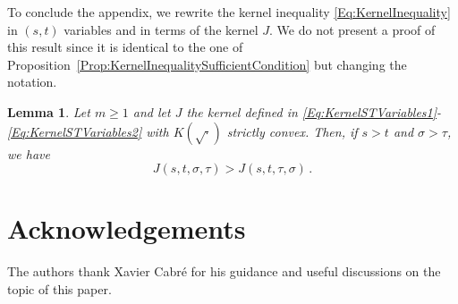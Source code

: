 \documentclass[12pt,reqno]{amsart}
\newtheorem{lemma}[theorem]{Lemma}
\theoremstyle{definition}
\theoremstyle{remark}
\numberwithin{equation}{section}
\begin{document}
To conclude the appendix, we rewrite the kernel inequality \eqref{Eq:KernelInequality} in $(s,t)$ variables and in terms of the kernel $J$. We do not present a proof of this result since it is identical to the one of Proposition~\ref{Prop:KernelInequalitySufficientCondition} but changing the notation.

\begin{lemma}
	\label{Lemma:KernelInequalityCone} Let $m\geq 1$ and let $J$ the kernel defined in
	\eqref{Eq:KernelSTVariables1}-\eqref{Eq:KernelSTVariables2} with $K(\sqrt{\cdot})$ strictly convex. Then, if $s>t$ and $\sigma > \tau$, we have
	\begin{equation*}
	J(s,t,\sigma, \tau) > J(s,t,\tau, \sigma)\,.
	\end{equation*}
\end{lemma}


\section*{Acknowledgements}
The authors thank Xavier Cabré for his guidance and useful discussions on the topic of this paper.



\end{document}
